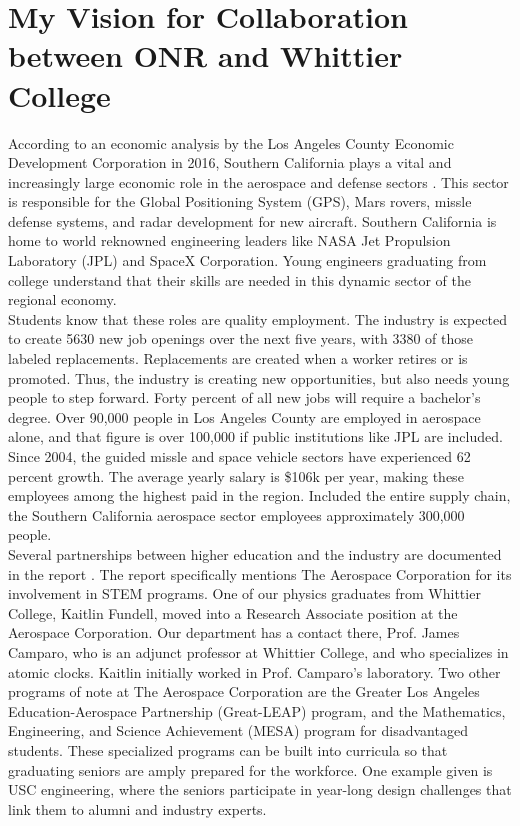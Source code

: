 \documentclass[../../../main.tex]{subfiles}
\begin{document}
\section{My Vision for Collaboration between ONR and Whittier College}
\label{sec:naval_collaboration}

According to an economic analysis by the Los Angeles County Economic Development Corporation in 2016, Southern California plays a vital and increasingly large economic role in the aerospace and defense sectors \cite{laedc}.  This sector is responsible for the Global Positioning System (GPS), Mars rovers, missle defense systems, and radar development for new aircraft.  Southern California is home to world reknowned engineering leaders like NASA Jet Propulsion Laboratory (JPL) and SpaceX Corporation.  Young engineers graduating from college understand that their skills are needed in this dynamic sector of the regional economy.
\\
\vspace{0.25cm}
Students know that these roles are quality employment.  The industry is expected to create 5630 new job openings over the next five years, with 3380 of those labeled replacements.  Replacements are created when a worker retires or is promoted.  Thus, the industry is creating new opportunities, but also needs young people to step forward.  Forty percent of all new jobs will require a bachelor's degree.  Over 90,000 people in Los Angeles County are employed in aerospace alone, and that figure is over 100,000 if public institutions like JPL are included.  Since 2004, the guided missle and space vehicle sectors have experienced 62 percent growth.  The average yearly salary is \$106k per year, making these employees among the highest paid in the region.  Included the entire supply chain, the Southern California aerospace sector employees approximately 300,000 people.
\\
\vspace{0.25cm}
Several partnerships between higher education and the industry are documented in the report \cite{laedc}.  The report specifically mentions The Aerospace Corporation for its involvement in STEM programs.  One of our physics graduates from Whittier College, Kaitlin Fundell, moved into a Research Associate position at the Aerospace Corporation.  Our department has a contact there, Prof. James Camparo, who is an adjunct professor at Whittier College, and who specializes in atomic clocks.  Kaitlin initially worked in Prof. Camparo's laboratory.  Two other programs of note at The Aerospace Corporation are the Greater Los Angeles Education-Aerospace Partnership (Great-LEAP) program, and the Mathematics, Engineering, and Science Achievement (MESA) program for disadvantaged students.  These specialized programs can be built into curricula so that graduating seniors are amply prepared for the workforce.  One example given is USC engineering, where the seniors participate in year-long design challenges that link them to alumni and industry experts.
\end{document}
